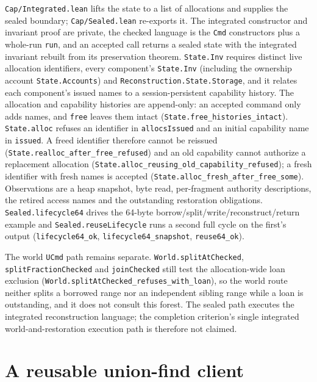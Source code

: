 \documentclass[10pt,a4paper]{article}
\newcommand{\file}[1]{\texttt{\small #1}}
\begin{document}
\file{Cap/Integrated.lean} lifts the state to a list of allocations and supplies
the sealed boundary; \file{Cap/Sealed.lean} re-exports it. The integrated
constructor and invariant proof are private, the checked language is the
\texttt{Cmd} constructors plus a whole-run \texttt{run}, and an accepted call
returns a sealed state with the integrated invariant rebuilt from its
preservation theorem. \texttt{State.Inv} requires distinct live allocation
identifiers, every component's \texttt{State.Inv} (including the ownership
account \texttt{State.Accounts}) and
\texttt{Reconstruction.State.Storage}, and it relates each component's issued
names to a session-persistent capability history. The allocation and capability
histories are append-only: an accepted command only adds names, and
\texttt{free} leaves them intact (\texttt{State.free\_histories\_intact}).
\texttt{State.alloc} refuses an
identifier in \texttt{allocsIssued} and an initial capability name in
\texttt{issued}. A freed identifier therefore cannot be reissued
(\texttt{State.realloc\_after\_free\_refused}) and an old capability cannot
authorize a replacement allocation
(\texttt{State.alloc\_reusing\_old\_capability\_refused}); a fresh identifier with
fresh names is accepted (\texttt{State.alloc\_fresh\_after\_free\_some}).
Observations are a heap
snapshot, byte read, per-fragment authority descriptions, the retired access
names and the outstanding restoration obligations. \texttt{Sealed.lifecycle64}
drives the 64-byte borrow/split/write/reconstruct/return example and
\texttt{Sealed.reuseLifecycle} runs a second full cycle on the first's output
(\texttt{lifecycle64\_ok}, \texttt{lifecycle64\_snapshot}, \texttt{reuse64\_ok}).

The world \texttt{UCmd} path remains separate. \texttt{World.splitAtChecked},
\texttt{splitFractionChecked} and \texttt{joinChecked} still test the
allocation-wide loan exclusion
(\texttt{World.splitAtChecked\_refuses\_with\_loan}), so the world route neither
splits a borrowed range nor an independent sibling range while a loan is
outstanding, and it does not consult this forest. The sealed path executes the
integrated reconstruction language; the completion criterion's single integrated
world-and-restoration execution path is therefore not claimed.

\section{A reusable union-find client}\label{sec:reuse}
\end{document}
